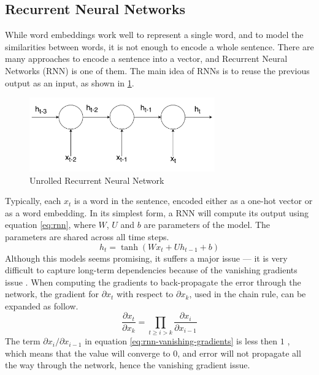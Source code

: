 \subsection{\label{ssec:rnn}Recurrent Neural Networks}
While word embeddings work well to represent a single word, and to model the
similarities between words, it is not enough to encode a whole sentence. There
are many approaches to encode a sentence into a vector, and Recurrent Neural
Networks (RNN) is one of them. The main idea of RNNs is to reuse the previous
output as an input, as shown in \ref{fig:rnn}.
\begin{figure}[tb]
  \begin{center}
    \includegraphics[width=8cm]{./images/rnn.pdf}
    \caption{\label{fig:rnn}Unrolled Recurrent Neural Network}
  \end{center}
\end{figure}
Typically, each $x_t$ is a word in the sentence, encoded either as a
one-hot vector or as a word embedding. In its simplest form, a RNN will compute
its output using equation \ref{eq:rnn}, where $W$, $U$ and $b$ are parameters of
the model. The parameters are shared across all time steps.
\begin{equation}
  h_t = \tanh\left( W x_t + U h_{t - 1} + b \right) \label{eq:rnn}
\end{equation}
Although this models seems promising, it suffers a major issue --- it is very
difficult to capture long-term dependencies because of the vanishing gradients
issue \cite{pascanu2013difficulty}. When computing the gradients to
back-propagate the error through the network, the gradient for $\partial x_t$
with respect to $\partial x_k$, used in the chain rule, can be expanded as
follow.
\begin{equation}
  \frac{\partial x_t}{\partial x_k} = \prod_{t \geq i > k} \frac{\partial x_i}{\partial x_{i-1}}
  \label{eq:rnn-vanishing-gradients}
\end{equation}
The term $\partial x_i/\partial x_{i-1}$ in equation
\ref{eq:rnn-vanishing-gradients} is less then $1$ \cite{pascanu2013difficulty},
which means that the value will converge to $0$, and error will not propagate
all the way through the network, hence the vanishing gradient issue.

